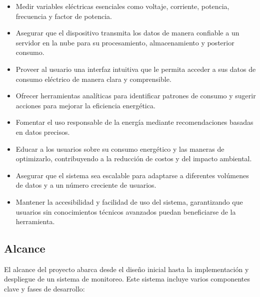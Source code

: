\begin{itemize}
	\item Medir variables eléctricas esenciales como voltaje, corriente, potencia, frecuencia y factor de potencia.
	
	\item Asegurar que el dispositivo transmita los datos de manera confiable a un servidor en la nube para su procesamiento, almacenamiento y posterior consumo.

	\item  Proveer al usuario una interfaz intuitiva que le permita acceder a sus datos de consumo eléctrico de manera clara y comprensible.

	\item Ofrecer herramientas analíticas para identificar patrones de consumo y sugerir acciones para mejorar la eficiencia energética. 
	
	\item Fomentar el uso responsable de la energía mediante recomendaciones basadas en datos precisos.
	
	\item Educar a los usuarios sobre su consumo energético y las maneras de optimizarlo, contribuyendo a la reducción de costos y del impacto ambiental.
	
	\item Asegurar que el sistema sea escalable para adaptarse a diferentes volúmenes de datos y a un número creciente de usuarios.
	
	\item Mantener la accesibilidad y facilidad de uso del sistema, garantizando que usuarios sin conocimientos técnicos avanzados puedan beneficiarse de la herramienta.
\end{itemize}

\subsection{Alcance}

El alcance del proyecto abarca desde el diseño inicial hasta la implementación y despliegue de un sistema de monitoreo. Este sistema incluye varios componentes clave y fases de desarrollo:

